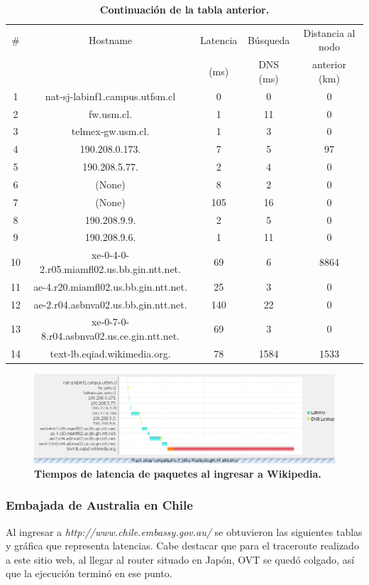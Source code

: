 \documentclass[12pt]{article}
\begin{document}
\begin{table}[H]
\centering
\begin{tabular}{| c | c | c | c | c |}
\hline
\# & Hostname & Latencia & Búsqueda & Distancia al nodo\\
 &  & (ms) & DNS (ms) & anterior (km)\\
\hline
1 & nat-sj-labinf1.campus.utfsm.cl & 0 & 0 & 0\\
\hline
2 & fw.usm.cl. & 1 & 11 & 0\\
\hline
3 & telmex-gw.usm.cl. & 1 & 3 & 0\\
\hline
4 & 190.208.0.173. & 7 & 5 & 97\\
\hline
5 & 190.208.5.77. & 2 & 4 & 0\\
\hline
6 & (None) & 8 & 2 & 0\\
\hline
7 & (None) & 105 & 16 & 0\\
\hline
8 & 190.208.9.9. & 2 & 5 & 0\\
\hline
9 & 190.208.9.6. & 1 & 11 & 0\\
\hline
10 & xe-0-4-0-2.r05.miamfl02.us.bb.gin.ntt.net. & 69 & 6 & 8864\\
\hline
11 & ae-4.r20.miamfl02.us.bb.gin.ntt.net. & 25 & 3 & 0\\
\hline
12 & ae-2.r04.asbnva02.us.bb.gin.ntt.net. & 140 & 22 & 0\\
\hline
13 & xe-0-7-0-8.r04.asbnva02.us.ce.gin.ntt.net. & 69 & 3 & 0\\
\hline
14 & text-lb.eqiad.wikimedia.org. & 78 & 1584 & 1533\\
\hline
\end{tabular}
\caption{\small \textbf{Continuación de la tabla anterior.}}
\end{table}

\begin{figure}[H] 
\centering 
\includegraphics[width=1\textwidth]{imagenes/wiki_grafica.png} \caption{\small \textbf{Tiempos de latencia de paquetes al ingresar a Wikipedia.}}
\label{fig:diagrama_1} 
\end{figure}

\subsubsection{Embajada de Australia en Chile}
Al ingresar a \emph{http://www.chile.embassy.gov.au/} se obtuvieron las siguientes tablas y gráfica que representa latencias. Cabe destacar que para el traceroute realizado a este sitio web, al llegar al router situado en Japón, OVT se quedó colgado, así que la ejecución terminó en ese punto.\\
\end{document}

